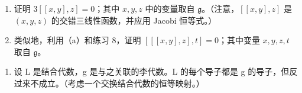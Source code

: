 \begin{enumerate}
\def\labelenumi{(\alph{enumi})}
\item
  证明 \(3[[x,y],z] = 0\)；其中 \(x,y,z\) 中的变量取自 \(\mathfrak{g}\)。（注意，\([[x,y],z]\) 是 \((x,y,z)\) 的交错三线性函数，并应用 Jacobi 恒等式。）
\item
  类似地，利用（a）和练习 8，证明 \(\left[[[x,y],z],t\right]=0\)；其中变量 \(x,y,z,t\) 取自 \(\mathfrak{g}\)。
\end{enumerate}

\begin{enumerate}
\def\labelenumi{\arabic{enumi}.}
\setcounter{enumi}{9}
\tightlist
\item
  设 L 是结合代数，g 是与之关联的李代数。L 的每个导子都是 g 的导子，但反过来不成立。（考虑一个交换结合代数的恒等映射。）
\end{enumerate}
